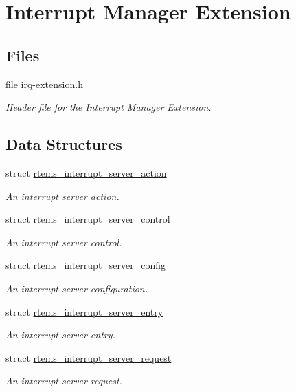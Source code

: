 \hypertarget{group__rtems__interrupt__extension}{}\section{Interrupt Manager Extension}
\label{group__rtems__interrupt__extension}
\subsection*{Files}
\begin{DoxyCompactItemize}
\item 
file \mbox{\hyperlink{irq-extension_8h}{irq-\/extension.\+h}}
\begin{DoxyCompactList}\small\item\em Header file for the Interrupt Manager Extension. \end{DoxyCompactList}\end{DoxyCompactItemize}
\subsection*{Data Structures}
\begin{DoxyCompactItemize}
\item 
struct \mbox{\hyperlink{structrtems__interrupt__server__action}{rtems\+\_\+interrupt\+\_\+server\+\_\+action}}
\begin{DoxyCompactList}\small\item\em An interrupt server action. \end{DoxyCompactList}\item 
struct \mbox{\hyperlink{structrtems__interrupt__server__control}{rtems\+\_\+interrupt\+\_\+server\+\_\+control}}
\begin{DoxyCompactList}\small\item\em An interrupt server control. \end{DoxyCompactList}\item 
struct \mbox{\hyperlink{structrtems__interrupt__server__config}{rtems\+\_\+interrupt\+\_\+server\+\_\+config}}
\begin{DoxyCompactList}\small\item\em An interrupt server configuration. \end{DoxyCompactList}\item 
struct \mbox{\hyperlink{structrtems__interrupt__server__entry}{rtems\+\_\+interrupt\+\_\+server\+\_\+entry}}
\begin{DoxyCompactList}\small\item\em An interrupt server entry. \end{DoxyCompactList}\item 
struct \mbox{\hyperlink{structrtems__interrupt__server__request}{rtems\+\_\+interrupt\+\_\+server\+\_\+request}}
\begin{DoxyCompactList}\small\item\em An interrupt server request. \end{DoxyCompactList}\end{DoxyCompactItemize}
